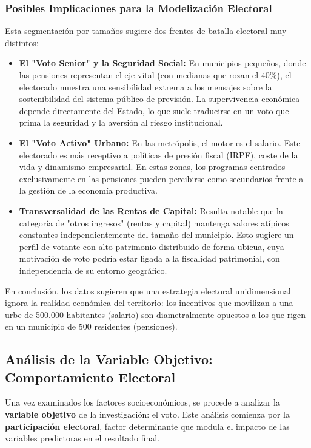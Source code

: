 \subsubsection{Posibles Implicaciones para la Modelización Electoral}

Esta segmentación por tamaños sugiere dos frentes de batalla electoral muy distintos:

\begin{itemize}
    \item \textbf{El "Voto Senior" y la Seguridad Social:} En municipios pequeños, donde las pensiones representan el eje vital (con medianas que rozan el 40\%), el electorado muestra una sensibilidad extrema a los mensajes sobre la sostenibilidad del sistema público de previsión. La supervivencia económica depende directamente del Estado, lo que suele traducirse en un voto que prima la seguridad y la aversión al riesgo institucional.
    \item \textbf{El "Voto Activo" Urbano:} En las metrópolis, el motor es el salario. Este electorado es más receptivo a políticas de presión fiscal (IRPF), coste de la vida y dinamismo empresarial. En estas zonas, los programas centrados exclusivamente en las pensiones pueden percibirse como secundarios frente a la gestión de la economía productiva.
    \item \textbf{Transversalidad de las Rentas de Capital:} Resulta notable que la categoría de "otros ingresos" (rentas y capital) mantenga valores atípicos constantes independientemente del tamaño del municipio. Esto sugiere un perfil de votante con alto patrimonio distribuido de forma ubicua, cuya motivación de voto podría estar ligada a la fiscalidad patrimonial, con independencia de su entorno geográfico.
\end{itemize}

En conclusión, los datos sugieren que una estrategia electoral unidimensional ignora la realidad económica del territorio: los incentivos que movilizan a una urbe de 500.000 habitantes (salario) son diametralmente opuestos a los que rigen en un municipio de 500 residentes (pensiones).

\subsection{Análisis de la Variable Objetivo: Comportamiento Electoral}

Una vez examinados los factores socioeconómicos, se procede a analizar la \textbf{variable objetivo} de la investigación: el voto. Este análisis comienza por la \textbf{participación electoral}, factor determinante que modula el impacto de las variables predictoras en el resultado final.

